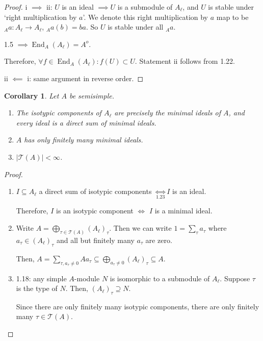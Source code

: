 \documentclass{article}
\theoremstyle{definition}
\theoremstyle{plain}
\newtheorem{corollary}[theorem]{Corollary}
\theoremstyle{remark}
\begin{document}
    \begin{proof}
        i \(\implies\) ii: \(U\) is an ideal \(\implies U\) is a submodule of \(A_\ell\), and \(U\) is stable under `right multiplication by \(a\)'. We denote this right multiplication by \(a\) map to be \(_A a : A_\ell \to A_\ell\), \(_A a (b) = ba\). So \(U\) is stable under all \(_A a\).
        
        1.5 \(\implies \operatorname{End}_A(A_\ell) = A^o\).
        
        Therefore, \(\forall f\in \operatorname{End}_A(A_\ell) : f(U) \subset U\). Statement ii follows from 1.22.

        ii \(\impliedby\) i: same argument in reverse order.
    \end{proof}

    \begin{corollary}
        Let \(A\) be semisimple.

        \begin{enumerate}[label=\roman*)]
            \item The isotypic components of \(A_\ell\) are precisely the minimal ideals of \(A\), and every ideal is a direct sum of minimal ideals.
            \item \(A\) has only finitely many minimal ideals. 
            \item \(\vert \mathcal{T}(A) \vert < \infty\).
        \end{enumerate} 
    \end{corollary}

    \begin{proof}
        \begin{enumerate}[label=\roman*)]
            \item \(I \subseteq A_\ell\) a direct sum of isotypic components \(\underset{1.23}{\iff} I\) is an ideal.
            
            Therefore, \(I\) is an isotypic component \(\iff\) \(I\) is a minimal ideal.

            \item Write \(A = \bigoplus_{\tau \in \mathcal{T}(A)} (A_\ell)_{\tau}\). Then we can write \(1 = \sum_{\tau} a_{\tau} \) where \(a_{\tau} \in (A_{\ell})_{\tau}\) and all but finitely many \(a_\tau\) are zero.
            
            Then, \(A = \sum_{\tau, a_{\tau} \neq 0} A a_{\tau} \subseteq \bigoplus_{a_{\tau} \neq 0} (A_\ell)_{\tau} \subseteq A\).

            \item 1.18: any simple \(A\)-module \(N\) is isomorphic to a submodule of \(A_\ell\). Suppose \(\tau\) is the type of \(N\). Then, \((A_\ell)_{\tau} \supseteq N\).
            
            Since there are only finitely many isotypic components, there are only finitely many \(\tau \in \mathcal{T}(A)\).
        \end{enumerate} 
    \end{proof}
\end{document}
